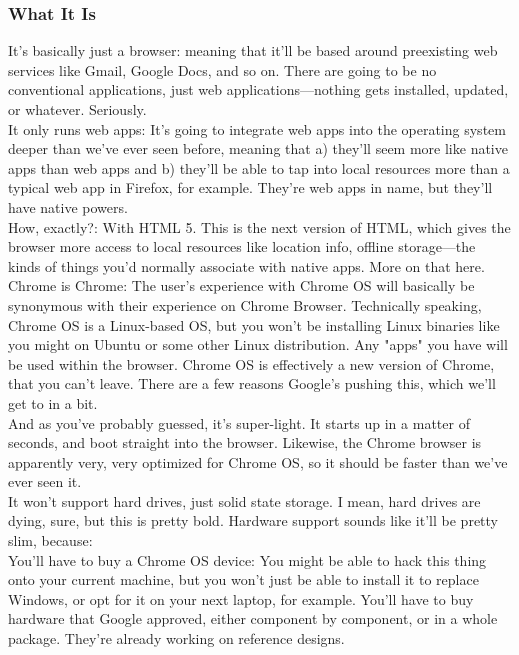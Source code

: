 \documentclass{article}
\begin{document}
	 \subsubsection{What It Is}
	  It's basically just a browser: meaning that it'll be based around preexisting web services like Gmail, Google Docs, and so on. There are going to be no conventional applications, just web applications—nothing gets installed, updated, or whatever. Seriously.\\

	  It only runs web apps: It's going to integrate web apps into the operating system deeper than we've ever seen before, meaning that a) they'll seem more like native apps than web apps and b) they'll be able to tap into local resources more than a typical web app in Firefox, for example. They're web apps in name, but they'll have native powers.\\

	  How, exactly?: With HTML 5. This is the next version of HTML, which gives the browser more access to local resources like location info, offline storage—the kinds of things you'd normally associate with native apps. More on that here.\\

	  Chrome is Chrome: The user's experience with Chrome OS will basically be synonymous with their experience on Chrome Browser. Technically speaking, Chrome OS is a Linux-based OS, but you won't be installing Linux binaries like you might on Ubuntu or some other Linux distribution. Any "apps" you have will be used within the browser. Chrome OS is effectively a new version of Chrome, that you can't leave. There are a few reasons Google's pushing this, which we'll get to in a bit.\\

	  And as you've probably guessed, it's super-light. It starts up in a matter of seconds, and boot straight into the browser. Likewise, the Chrome browser is apparently very, very optimized for Chrome OS, so it should be faster than we've ever seen it.\\

	  It won't support hard drives, just solid state storage. I mean, hard drives are dying, sure, but this is pretty bold. Hardware support sounds like it'll be pretty slim, because:\\

	   You'll have to buy a Chrome OS device: You might be able to hack this thing onto your current machine, but you won't just be able to install it to replace Windows, or opt for it on your next laptop, for example. You'll have to buy hardware that Google approved, either component by component, or in a whole package. They're already working on reference designs.\\
\end{document}
